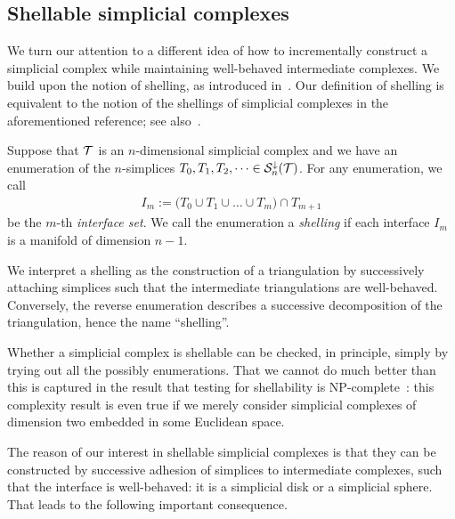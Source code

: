 \documentclass[12pt,a4paper]{article}
\begin{document}
\subsection{Shellable simplicial complexes}

We turn our attention to a different idea of how to incrementally construct a simplicial complex while maintaining well-behaved intermediate complexes. 
We build upon the notion of shelling, as introduced in~\cite[Definition 8.1]{ziegler2012lectures}.
Our definition of shelling is equivalent to the notion of the shellings of simplicial complexes in the aforementioned reference; see also~\cite[Remark~8.3]{ziegler2012lectures}. 

Suppose that ${\mathcal T}$ is an $n$-dimensional simplicial complex and we have an enumeration of the $n$-simplices $T_{0}, T_{1}, T_{2}, \dots \in {\mathcal S}^{\downarrow}_{n}({\mathcal T})$.
For any enumeration, we call 
\begin{align*}
    I_m 
    := 
    \big( 
        T_{0} \cup T_{1} \cup \dots \cup T_{m} 
    \big) 
    \cap 
    T_{m+1}
\end{align*}
be the $m$-th \textit{interface set}. 
We call the enumeration a \emph{shelling} if each interface $I_m$ is a manifold of dimension $n-1$. 

\begin{remark}
    We interpret a shelling as the construction of a triangulation 
    by successively attaching simplices such that the intermediate triangulations are well-behaved. 
    Conversely, the reverse enumeration describes a successive decomposition of the triangulation, hence the name ``shelling''.
\end{remark}
\begin{remark}
    Whether a simplicial complex is shellable can be checked, in principle, simply by trying out all the possibly enumerations.
    That we cannot do much better than this is captured in the result that testing for shellability is NP-complete~\cite{goaoc2019shellability}:
    this complexity result is even true if we merely consider simplicial complexes of dimension two embedded in some Euclidean space.
\end{remark}




The reason of our interest in shellable simplicial complexes is that they can be constructed by successive adhesion of simplices to intermediate complexes, 
such that the interface is well-behaved: it is a simplicial disk or a simplicial sphere. 
That leads to the following important consequence.
\end{document}
